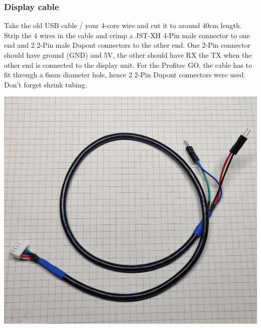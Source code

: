 \documentclass[]{article}
\begin{document}
\subsubsection{Display cable}
\begin{minipage}[t]{0.5\linewidth}
	\vspace{0pt}
	Take the old USB cable / your 4-core wire and cut it to around 40cm length. Strip the 4 wires in the cable and crimp a JST-XH 4-Pin male connector to one end and 2 2-Pin male Dupont connectors to the other end. One 2-Pin connector should have ground (GND) and 5V, the other should have RX the TX when the other end is connected to the display unit. For the Profitec GO, the cable has to fit through a 6mm diameter hole, hence 2 2-Pin Dupont connectors were used. Don't forget shrink tubing.
\end{minipage}
\hfill
\begin{minipage}[t]{0.4\linewidth}
	\vspace{0pt}
	\includegraphics[width=\linewidth]{images/02_wiring/01_display_internals.jpg}
\end{minipage}
\end{document}
